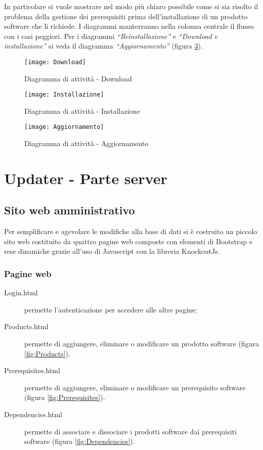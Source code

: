 \documentclass[../RelazioneFinale.tex]{subfiles}
\begin{document}
			In particolare si vuole mostrare nel modo più chiaro possibile come si sia risolto il problema della gestione dei prerequisiti prima dell'installazione di un prodotto software che li richiede.
			I diagrammi manterranno nella colonna centrale il flusso con i casi peggiori. Per i diagrammi \emph{``Reinstallazione''} e \emph{``Download e installazione''} si veda il diagramma \emph{``Aggiornamento''} (figura \ref{fig:Aggiornamento}).
			
			\begin{figure}[p]
				\centering
				\texttt{[image: Download]}
				\caption{Diagramma di attività - Download}
				\label{fig:Download}
			\end{figure}
			
			\begin{figure}[p]
				\centering
				\texttt{[image: Installazione]}
				\caption{Diagramma di attività - Installazione}
				\label{fig:Installazione}
			\end{figure}
			
			\begin{figure}
				\texttt{[image: Aggiornamento]}
				\caption{Diagramma di attività - Aggiornamento}
				\label{fig:Aggiornamento}
			\end{figure}
		
		
\newpage %

		\section{Updater - Parte server}
		
			\subsection{Sito web amministrativo}
			\label{sec:SitoWeb}
				Per semplificare e agevolare le modifiche alla base di dati si è costruito un piccolo sito web costituito da quattro pagine web composte con elementi di Bootstrap e rese dinamiche grazie all'uso di Javascript con la libreria KnockoutJs.
				
				\subsubsection{Pagine web}
				\begin{description}
					\item[Login.html] permette l'autenticazione per accedere alle altre pagine;
					\item[Products.html] permette di aggiungere, eliminare o modificare un prodotto software (figura \ref{fig:Products}).
					\item[Prerequisites.html] permette di aggiungere, eliminare o modificare un prerequisito software (figura \ref{fig:Prerequisites}).
					\item[Dependencies.html] permette di associare e dissociare i prodotti software dai prerequisiti software (figura \ref{fig:Dependencies}).
				\end{description}
				
\end{document}
